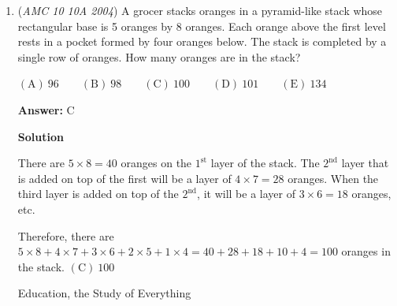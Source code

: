\begin{enumerate}
Since Bertha has $6$ daughters, she has $30-6=24$ granddaughters, of which none have daughters.  Of Bertha's daughters, $\frac{24}6=4$ have daughters, so $6-4=2$ do not have daughters. Therefore, of Bertha's daughters and granddaughters, $24+2=26$ do not have daughters.  $\boxed{\mathrm{(E)}\ 26}$




\textbf{Solution 2 (From Alcumus)}

Bertha has $30 - 6 = 24$ granddaughters, none of whom have any daughters. The granddaughters are the children of $24/6 = 4$ of Bertha's daughters, so the number of women having no daughters is $30 - 4 = \boxed{26}$.

 



\textbf{Solution 3}

Draw a tree diagram and see that the answer can be found in the sum of $6+6$ granddaughters, $5+5$ daughters, and $4$ more daughters.  Adding them together gives the answer of $\boxed{\mathrm{(E)}\ 26}$.

 Education, the Study of Everything

 


	\item (\textit{AMC 10 10A 2004}) A grocer stacks oranges in a pyramid-like stack whose rectangular base is 5 oranges by 8 oranges.  Each orange above the first level rests in a pocket formed by four oranges below.  The stack is completed by a single row of oranges.  How many oranges are in the stack?


 $\mathrm{(A) \ } 96 \qquad \mathrm{(B) \ } 98 \qquad \mathrm{(C) \ } 100 \qquad \mathrm{(D) \ } 101 \qquad \mathrm{(E) \ } 134$

 \textbf{Answer: }C



\textbf{Solution}

There are $5\times8=40$ oranges on the $1^{\text{st}}$ layer of the stack. The $2^{\text{nd}}$ layer that is added on top of the first will be a layer of $4\times7=28$ oranges.  When the third layer is added on top of the $2^{\text{nd}}$, it will be a layer of $3\times6=18$ oranges, etc.

 Therefore, there are $5\times8+4\times7+3\times6+2\times5+1\times4=40+28+18+10+4=100$ oranges in the stack. $\boxed{\mathrm{(C)}\ 100}$

 


 Education, the Study of Everything

 



\end{enumerate}
